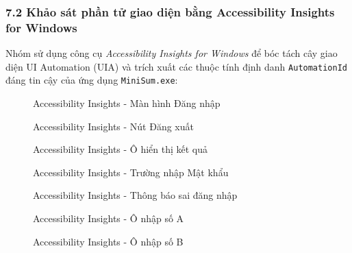 \subsubsection{7.2 Khảo sát phần tử giao diện bằng Accessibility Insights for Windows}
Nhóm sử dụng công cụ \textit{Accessibility Insights for Windows} để bóc tách cây giao diện UI Automation (UIA) và trích xuất các thuộc tính định danh \texttt{AutomationId} đáng tin cậy của ứng dụng \texttt{MiniSum.exe}:

\begin{figure}[H]
\centering
\caption{Accessibility Insights - Màn hình Đăng nhập}
\end{figure}


\begin{figure}[H]
\centering
\caption{Accessibility Insights - Nút Đăng xuất}
\end{figure}


\begin{figure}[H]
\centering
\caption{Accessibility Insights - Ô hiển thị kết quả}
\end{figure}


\begin{figure}[H]
\centering
\caption{Accessibility Insights - Trường nhập Mật khẩu}
\end{figure}


\begin{figure}[H]
\centering
\caption{Accessibility Insights - Thông báo sai đăng nhập}
\end{figure}


\begin{figure}[H]
\centering
\caption{Accessibility Insights - Ô nhập số A}
\end{figure}


\begin{figure}[H]
\centering
\caption{Accessibility Insights - Ô nhập số B}
\end{figure}


